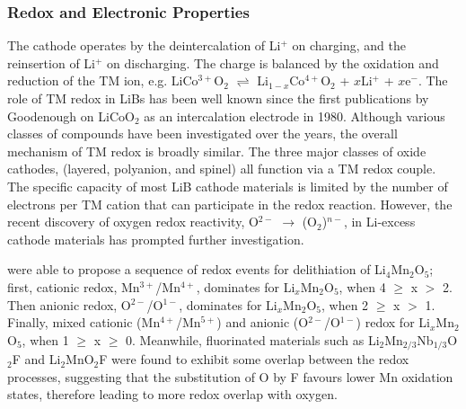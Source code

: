 \documentclass[../main.tex]{subfiles}
\begin{document}
\subsubsection{Redox and Electronic Properties}
The cathode operates by the deintercalation of Li$^+$ on charging, and the reinsertion of Li$^+$ on discharging. The charge is balanced by the oxidation and reduction of the TM ion, e.g. LiCo$^{3+}$O$_2$ $\rightleftharpoons$ Li$_{1-x}$Co$^{4+}$O$_2$ + $x$Li$^+$ + $x$e$^-$. 
The role of TM redox in LiBs has been well known since the first publications by Goodenough on LiCoO$_2$ as an intercalation electrode in 1980.\cite{mizushima1980lixcoo2} Although various classes of compounds have been investigated over the years, the overall mechanism of TM redox is broadly similar. The three major classes of oxide cathodes, (layered,\cite{mizushima1980lixcoo2} polyanion,\cite{padhi1997olivine} and spinel\cite{Thackeray1983}) all function via a TM redox couple. The specific capacity of most LiB cathode materials is limited by the number of electrons per TM cation that can participate in the redox reaction. However, the recent discovery of oxygen redox reactivity, O$^{2-}$ $\to$ (O$_2$)$^{n-}$,  in Li-excess cathode materials\cite{Koga2013, Sathiya2013, Oishi2015, Sathiya2015, McCalla2015, Cao2015, Shimoda2016, Chen2016, Luo2016a, Hy2016, Muhammad2016, Seo2016, Gent2017, Zhan2017,  Zheng2017,Assat2018, BenYahia2019, naylor2019depth, Hua2019, House2020, Li2019, Eum2020, Gent2020, Sharpe2020} has prompted further investigation.

 \citeauthor{Yao2018} were able to propose a sequence of redox events for delithiation of Li$_4$Mn$_2$O$_5$;\cite{Yao2018} first, cationic redox, Mn$^{3+}$/Mn$^{4+}$, dominates for Li$_x$Mn$_2$O$_5$, when 4 $\geq$ x $>$ 2. Then anionic redox, O$^{2-}$/O$^{1-}$, dominates for Li$_x$Mn$_2$O$_5$, when 2 $\geq$ x $>$ 1. Finally, mixed cationic (Mn$^{4+}$/Mn$^{5+}$) and anionic (O$^{2-}$/O$^{1-}$) redox for Li$_x$Mn$_2$O$_5$, when 1 $\geq$ x $\geq$ 0. Meanwhile, fluorinated materials such as Li$_2$Mn$_{2/3}$Nb$_{1/3}$O$_2$F\cite{Lee2018} and Li$_2$MnO$_2$F\cite{Sharpe2020} were found to exhibit some overlap between the redox processes, suggesting that the substitution of O by F favours lower Mn oxidation states, therefore leading to more redox overlap with oxygen. \cite{Cao2015, Sathiya2013a} \cite{Zhan2017, Xiao2012}
\end{document}
